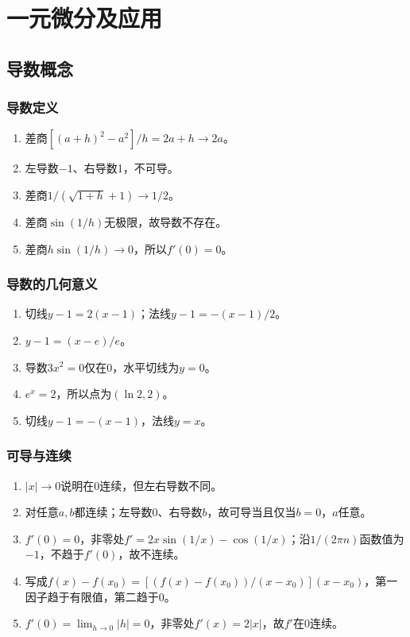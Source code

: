 \documentclass[11pt,a4paper,fontset=fandol]{ctexrep}
\begin{document}
\chapter{一元微分及应用}
\section{导数概念}
\subsection{导数定义}
\begin{enumerate}
\item 差商$[(a+h)^2-a^2]/h=2a+h\to2a$。
\item 左导数$-1$、右导数1，不可导。
\item 差商$1/(\sqrt{1+h}+1)\to1/2$。
\item 差商$\sin(1/h)$无极限，故导数不存在。
\item 差商$h\sin(1/h)\to0$，所以$f'(0)=0$。
\end{enumerate}
\subsection{导数的几何意义}
\begin{enumerate}
\item 切线$y-1=2(x-1)$；法线$y-1=-(x-1)/2$。
\item $y-1=(x-e)/e$。
\item 导数$3x^2=0$仅在0，水平切线为$y=0$。
\item $e^x=2$，所以点为$(\ln2,2)$。
\item 切线$y-1=-(x-1)$，法线$y=x$。
\end{enumerate}
\subsection{可导与连续}
\begin{enumerate}
\item $|x|\to0$说明在0连续，但左右导数不同。
\item 对任意$a,b$都连续；左导数0、右导数$b$，故可导当且仅当$b=0$，$a$任意。
\item $f'(0)=0$，非零处$f'=2x\sin(1/x)-\cos(1/x)$；沿$1/(2\pi n)$函数值为$-1$，不趋于$f'(0)$，故不连续。
\item 写成$f(x)-f(x_0)=[(f(x)-f(x_0))/(x-x_0)](x-x_0)$，第一因子趋于有限值，第二趋于0。
\item $f'(0)=\lim_{h\to0}|h|=0$，非零处$f'(x)=2|x|$，故$f'$在0连续。
\end{enumerate}
\end{document}
